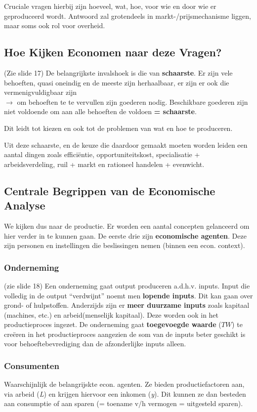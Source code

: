 Cruciale vragen hierbij zijn hoeveel, wat, hoe, voor wie en door wie er geproduceerd wordt. Antwoord zal grotendeels in markt-/prijsmechanisme liggen, maar soms ook rol voor overheid.

\subsection{Hoe Kijken Economen naar deze Vragen?}
(Zie slide 17) De belangrijkste invalshoek is die van \textbf{schaarste}.  Er zijn vele behoeften, quasi oneindig en de meeste zijn herhaalbaar, er zijn er ook die vermenigvuldigbaar zijn\\
$\rightarrow$ om behoeften te te vervullen zijn goederen nodig. Beschikbare goederen zijn niet voldoende om aan alle behoeften de voldoen \textbf{= schaarste}.

Dit leidt tot kiezen en ook tot de problemen van wat en hoe te produceren.

Uit deze schaarste, en de keuze die daardoor gemaakt moeten worden leiden een aantal dingen zoals effici\"{e}ntie, opportuniteitskost, specialisatie + arbeidsverdeling, ruil + markt en rationeel handelen + evenwicht.


\subsection{Centrale Begrippen van de Economische Analyse}
We kijken dus naar de productie. Er worden een aantal concepten gelanceerd om hier verder in te kunnen gaan. De eerste drie zijn \textbf{economische agenten}. Deze zijn personen en instellingen die beslissingen nemen (binnen een econ. context).

\subsubsection{Onderneming}
(zie slide 18) Een onderneming gaat output produceren a.d.h.v. inputs. Input die volledig in de output ``verdwijnt'' noemt men \textbf{lopende inputs}. Dit kan gaan over grond- of hulpstoffen. Anderzijds zijn er \textbf{meer duurzame inputs} zoals kapitaal (machines, etc.) en arbeid(menselijk kapitaal). Deze worden ook in het productieproces ingezet. De onderneming gaat \textbf{toegevoegde waarde} ($TW$) te cre\"{e}ren in het productieproces aangezien de som van de inputs beter geschikt is voor behoeftebevrediging dan de afzonderlijke inputs alleen.

\subsubsection{Consumenten}
Waarschijnlijk de belangrijskte econ. agenten. Ze bieden productiefactoren aan, via arbeid (\textit{L}) en krijgen hiervoor een inkomen (\textit{y}). Dit kunnen ze dan besteden aan consumptie of aan sparen (= toename v/h vermogen = uitgesteld sparen).

